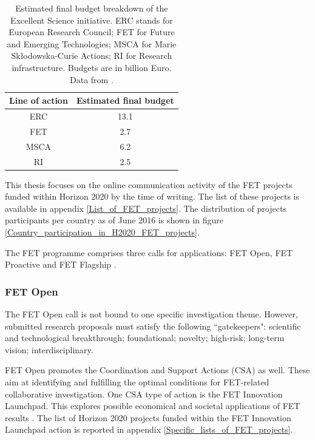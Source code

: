\begin{table}[t]
 \begin{center}
  \begin{tabular}{cc}
   \hline 
   \hline
   Line of action & Estimated final budget \\ 
   \hline
   \hline
   ERC & 13.1 \\
   FET & 2.7 \\
   MSCA & 6.2 \\
   RI & 2.5 \\
   \hline
   \hline
  \end{tabular}
 \end{center} 
 \caption{Estimated final budget breakdown of the Excellent Science initiative. ERC stands for European Research Council; FET for Future and Emerging Technologies; MSCA for Marie Sk\l{}odowska-Curie Actions; RI for Research infrastructure. Budgets are in billion Euro. Data from \cite{H2020Budget}.}
\label{FET_budget_breakdown} 
\end{table}

This thesis focuses on the online communication activity of the FET projects funded within Horizon 2020 by the time of writing. The list of these projects is available in appendix \ref{List_of_FET_projects}. The distribution of projects participants per country as of June 2016 is shown in figure \ref{Country_participation_in_H2020_FET_projects}.

The FET programme comprises three calls for applications: FET Open, FET Proactive and FET Flagship \cite{FETOpen,FETProactive,FETFlagship}.

\subsubsection{FET Open}
The FET Open call is not bound to one specific investigation theme. However, submitted research proposals must satisfy the following ``gatekeepers": scientific and technological breakthrough; foundational; novelty; high-risk; long-term vision; interdisciplinary. 

FET Open promotes the Coordination and Support Actions (CSA) as well. These aim at identifying and fulfilling the optimal conditions for FET-related collaborative investigation. One CSA type of action is the FET Innovation Launchpad. This explores possible economical and societal applications of FET results \cite{FETLaunchpad}. The list of Horizon 2020 projects funded within the FET Innovation Launchpad action is reported in appendix \ref{Specific_lists_of_FET_projects}. 

